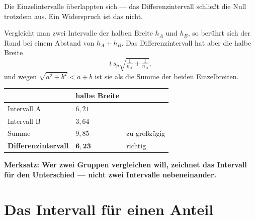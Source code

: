 \begin{warnung}
Die Einzelintervalle überlappten sich --- das Differenzintervall schließt die Null trotzdem aus. Ein Widerspruch ist das nicht.

Vergleicht man zwei Intervalle der halben Breite $h_A$ und $h_B$, so berührt sich der Rand bei einem Abstand von $h_A + h_B$. Das Differenzintervall hat aber die halbe Breite
\[ t\,s_p\sqrt{\tfrac{1}{n_A}+\tfrac{1}{n_B}} , \]
und wegen $\sqrt{a^2+b^2} < a+b$ ist sie  als die Summe der beiden Einzelbreiten.

\begin{center}
\renewcommand{\arraystretch}{1.48}
\begin{tabular}{@{}P{3.2cm}P{2.4cm}P{2.4cm}@{}}
\toprule
& \textbf{halbe Breite} & \\
\midrule
Intervall A & $6{,}21$ & \\
Intervall B & $3{,}64$ & \\
Summe & $9{,}85$ & \textcolor{akzent}{zu großzügig}\\
\textbf{Differenzintervall} & $\mathbf{6{,}23}$ & \textcolor{gruen}{richtig}\\
\bottomrule
\end{tabular}
\end{center}

\begin{center}
\begin{minipage}{0.88\textwidth}
\end{minipage}
\end{center}

\begin{center}
\begin{minipage}{0.9\textwidth}
\textbf{Merksatz: Wer zwei Gruppen vergleichen will, zeichnet das Intervall für den Unterschied --- nicht zwei Intervalle nebeneinander.}
\end{minipage}
\end{center}
\end{warnung}

\section{Das Intervall für einen Anteil}

